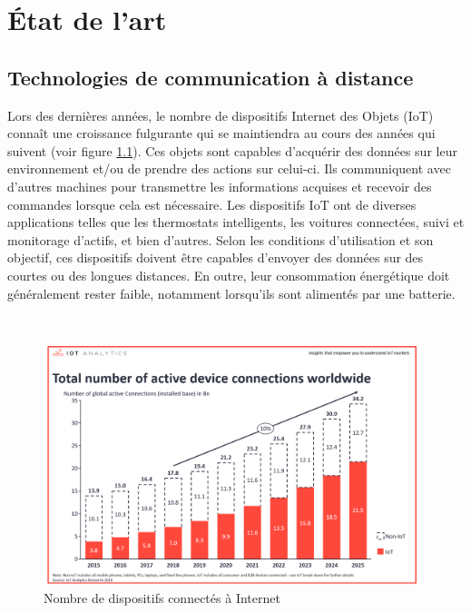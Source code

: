 \chapter{État de l'art}
\label{chap:2}

\section{Technologies de communication à distance}

\noindent
Lors des dernières années, le nombre de dispositifs Internet des Objets (IoT) connaît une croissance fulgurante qui se maintiendra au cours des années qui suivent (voir figure \ref{fig:iot_number}). Ces objets sont capables d'acquérir des données sur leur environnement et/ou de prendre des actions sur celui-ci. Ils communiquent avec d'autres machines pour transmettre les informations acquises et recevoir des commandes lorsque cela est nécessaire. Les dispositifs IoT ont de diverses applications telles que les thermostats intelligents, les voitures connectées, suivi et monitorage d'actifs, et bien d'autres. Selon les conditions d'utilisation et son objectif, ces dispositifs doivent être capables d'envoyer des données sur des courtes ou des longues distances. En outre, leur consommation énergétique doit généralement rester faible, notamment lorsqu'ils sont alimentés par une batterie.

~

\begin{figure}[H]
  \centering
  \includegraphics[width=0.97\textwidth]{img/state_of_the_art/iot_number_connected.png}
  \caption{Nombre de dispositifs connectés à Internet \cite{lueth_2018}}
  \label{fig:iot_number}
\end{figure}

